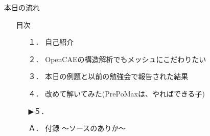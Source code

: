 \begin{frame}{本日の流れ}
  \begin{itemize}
      \item[] 目次
      \begin{itemize}[itemsep=1.3ex, leftmargin=1cm]
        \item[１．] 自己紹介
        \item[２．] OpenCAEの構造解析でもメッシュにこだわりたい
        \item[３．] 本日の例題と以前の勉強会で報告された結果
        \item[４．] 改めて解いてみた(PrePoMaxは、やればできる子) 
        \item[▶５．] 
        \item[Ａ．] 付録 ～ソースのありか～
      \end{itemize}
  \end{itemize}
\end{frame}
